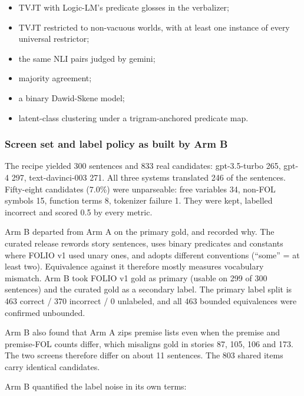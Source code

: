 \documentclass[11pt,letterpaper]{article}
\begin{document}
\begin{itemize}
\item {}TVJT with Logic-LM's predicate glosses in the verbalizer;
\item {}TVJT restricted to non-vacuous worlds, with at least one instance of every universal restrictor;
\item {}the same NLI pairs judged by gemini;
\item {}majority agreement;
\item {}a binary Dawid-Skene model;
\item {}latent-class clustering under a trigram-anchored predicate map.
\end{itemize}
\subsubsection{Screen set and label policy as built by Arm B}

The recipe yielded 300 sentences and 833 real candidates: gpt-3.5-turbo 265, gpt-4 297, text-davinci-003 271. All three systems translated 246 of the sentences. Fifty-eight candidates (7.0\%) were unparseable: free variables 34, non-FOL symbols 15, function terms 8, tokenizer failure 1. They were kept, labelled incorrect and scored 0.5 by every metric.

Arm B departed from Arm A on the primary gold, and recorded why. The curated release rewords story sentences, uses binary predicates and constants where FOLIO v1 used unary ones, and adopts different conventions (``some'' = at least two). Equivalence against it therefore mostly measures vocabulary mismatch. Arm B took FOLIO v1 gold as primary (usable on 299 of 300 sentences) and the curated gold as a secondary label. The primary label split is 463 correct / 370 incorrect / 0 unlabeled, and all 463 bounded equivalences were confirmed unbounded.

Arm B also found that Arm A zips premise lists even when the premise and premise-FOL counts differ, which misaligns gold in stories 87, 105, 106 and 173. The two screens therefore differ on about 11 sentences. The 803 shared items carry identical candidates.

Arm B quantified the label noise in its own terms:
\end{document}
